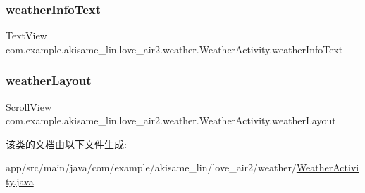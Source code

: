 \subsubsection{\texorpdfstring{weatherInfoText}{weatherInfoText}}
{\footnotesize\ttfamily Text\+View com.\+example.\+akisame\+\_\+lin.\+love\+\_\+air2.\+weather.\+Weather\+Activity.\+weather\+Info\+Text\hspace{0.3cm}{\ttfamily [private]}}

\mbox{\label{classcom_1_1example_1_1akisame__lin_1_1love__air2_1_1weather_1_1_weather_activity_a2725a02c59da32299f9f42df45ff757f}} 
\subsubsection{\texorpdfstring{weatherLayout}{weatherLayout}}
{\footnotesize\ttfamily Scroll\+View com.\+example.\+akisame\+\_\+lin.\+love\+\_\+air2.\+weather.\+Weather\+Activity.\+weather\+Layout\hspace{0.3cm}{\ttfamily [private]}}



该类的文档由以下文件生成\+:\begin{DoxyCompactItemize}
\item 
app/src/main/java/com/example/akisame\+\_\+lin/love\+\_\+air2/weather/\mbox{\hyperlink{java_2com_2example_2akisame__lin_2love__air2_2weather_2_weather_activity_8java}{Weather\+Activity.\+java}}\end{DoxyCompactItemize}
